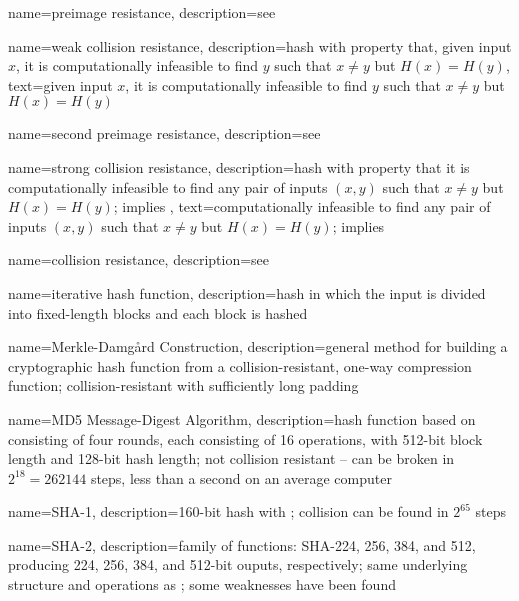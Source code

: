 {
    name={preimage resistance},
    description={see }
}

{
    name={weak collision resistance},
    description={hash with property that, given input $x$, it is computationally infeasible to find $y$ such that $x\neq y$ but $H(x) = H(y)$},
    text={given input $x$, it is computationally infeasible to find $y$ such that $x\neq y$ but $H(x) = H(y)$}
}

{
    name={second preimage resistance},
    description={see }
}

{
    name={strong collision resistance},
    description={hash with property that it is computationally infeasible to find any pair of inputs $(x, y)$ such that $x\neq y$ but $H(x) = H(y)$; implies },
    text={computationally infeasible to find any pair of inputs $(x, y)$ such that $x\neq y$ but $H(x) = H(y)$; implies }
}

{
    name={collision resistance},
    description={see }
}

{
    name={iterative hash function},
    description={hash in which the input is divided into fixed-length blocks and each block is hashed}
}

{
    name={Merkle-Damg\r{a}rd Construction},
    description={general method for building a cryptographic hash function from a collision-resistant, one-way compression function; collision-resistant with sufficiently long padding}
}

{
    name={MD5 Message-Digest Algorithm},
    description={hash function based on  consisting of four rounds, each consisting of 16 operations, with 512-bit block length and 128-bit hash length; not collision resistant -- can be broken in $2^{18} = 262144$ steps, less than a second on an average computer}
}

{
    name={SHA-1},
    description={160-bit hash with ; collision can be found in $2^{65}$ steps}
}

{
    name={SHA-2},
    description={family of functions: SHA-224, 256, 384, and 512, producing 224, 256, 384, and 512-bit ouputs, respectively; same underlying structure and operations as ; some weaknesses have been found}
}

